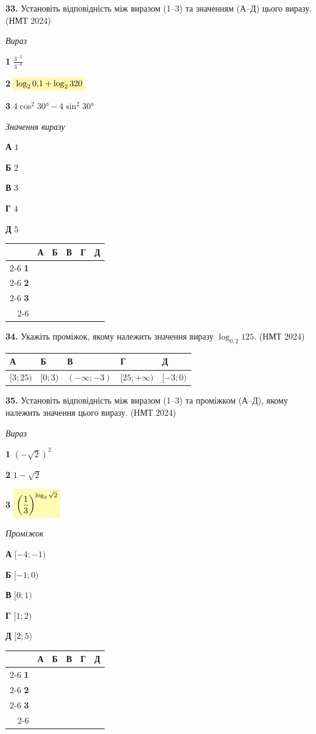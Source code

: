 \documentclass[14pt]{extarticle}
\newcommand{\answerGrid}{
    \begingroup
    \renewcommand{\arraystretch}{1.3} 
    \setlength{\tabcolsep}{7pt} 
    \begin{tabular}{r|c|c|c|c|c|}
         \multicolumn{1}{c}{} & \multicolumn{1}{c}{\textbf{А}} & \multicolumn{1}{c}{\textbf{Б}} & \multicolumn{1}{c}{\textbf{В}} & \multicolumn{1}{c}{\textbf{Г}} & \multicolumn{1}{c}{\textbf{Д}} \\ \cline{2-6}
         \textbf{1} & & & & & \\ \cline{2-6}
         \textbf{2} & & & & & \\ \cline{2-6}
         \textbf{3} & & & & & \\ \cline{2-6}
    \end{tabular}
    \endgroup
}
\newcommand{\matchingLayout}[3]{
    \noindent
    \begin{minipage}[t]{0.40\textwidth}
        #1
    \end{minipage}%
    \hfill
    \begin{minipage}[t]{0.28\textwidth}
        #2
    \end{minipage}%
    \hfill
    \begin{minipage}[t]{0.30\textwidth}
        \vspace{0pt}
        \begin{flushright}
        #3
        \end{flushright}
    \end{minipage}
}
\newcommand{\answerTable}[5]{
\begin{center}
\begin{tabular}{|*{5}{>{\centering\arraybackslash}m{2.8cm}|}}
\hline
\rule[-0.3cm]{0pt}{0.8cm}\textbf{А} & \textbf{Б} & \textbf{В} & \textbf{Г} & \textbf{Д} \\
\hline
\rule[-0.4cm]{0pt}{1.0cm}#1 & \rule[-0.4cm]{0pt}{1.0cm}#2 & \rule[-0.4cm]{0pt}{1.0cm}#3 & \rule[-0.4cm]{0pt}{1.0cm}#4 & \rule[-0.4cm]{0pt}{1.0cm}#5 \\
\hline
\end{tabular}
\end{center}
}
\newcommand{\nmtyear}[1]{\hfill{\small\color{yearcolor}(НМТ #1)}}
\begin{document}
\vspace{0.5cm}

\noindent\textbf{33.} Установіть відповідність між виразом (1--3) та значенням (А--Д) цього виразу. \nmtyear{2024}
\vspace{0.3cm}

\matchingLayout{\textit{Вираз}

\textbf{1} \quad $\displaystyle\frac{3^{-5}}{3^{-6}}$

\textbf{2} \quad $\colorbox{yellow!30}{$\log_2 0{,}1 + \log_2 320$}$

\textbf{3} \quad $4\cos^2 30° - 4\sin^2 30°$
}{
\textit{Значення виразу}

\textbf{А} \quad $1$

\textbf{Б} \quad $2$

\textbf{В} \quad $3$

\textbf{Г} \quad $4$

\textbf{Д} \quad $5$
}{
\answerGrid
}

\vspace{0.8cm}

\noindent\textbf{34.} Укажіть проміжок, якому належить значення виразу $\log_{0,2} 125$. \nmtyear{2024}
\vspace{0.3cm}

\answerTable{$[3; 25)$}{$[0; 3)$}{$(-\infty; -3)$}{$[25; +\infty)$}{$[-3; 0)$}

\vspace{0.5cm}

\noindent\textbf{35.} Установіть відповідність між виразом (1--3) та проміжком (А--Д), якому належить значення цього виразу. \nmtyear{2024}
\vspace{0.3cm}

\matchingLayout{\textit{Вираз}

\textbf{1} \quad $\left(-\sqrt{2}\right)^2$

\textbf{2} \quad $1 - \sqrt{2}$

\textbf{3} \quad $\colorbox{yellow!30}{$\left(\dfrac{1}{3}\right)^{\log_3 \sqrt{2}}$}$
}{
\textit{Проміжок}

\textbf{А} \quad $[-4; -1)$

\textbf{Б} \quad $[-1; 0)$

\textbf{В} \quad $[0; 1)$

\textbf{Г} \quad $[1; 2)$

\textbf{Д} \quad $[2; 5)$
}{
\answerGrid
}

\vspace{0.8cm}
\end{document}
